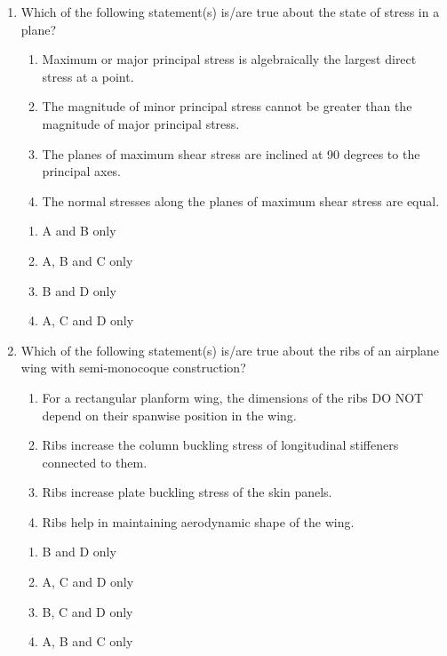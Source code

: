 \documentclass{article}
\begin{document}
\begin{enumerate}[leftmargin=*, resume]
\item Which of the following statement(s) is/are true about the state of stress in a plane?
\begin{enumerate}
\item Maximum or major principal stress is algebraically the largest direct stress at a point.
\item The magnitude of minor principal stress cannot be greater than the magnitude of major principal stress.
\item The planes of maximum shear stress are inclined at 90 degrees to the principal axes.
\item The normal stresses along the planes of maximum shear stress are equal.
\end{enumerate}
\begin{multicols}{4}
\begin{enumerate}
\item A and B only
\item A, B and C only
\item B and D only
\item A, C and D only
\end{enumerate}
\end{multicols}

\item Which of the following statement(s) is/are true about the ribs of an airplane wing with semi-monocoque construction?
\begin{enumerate}
\item For a rectangular planform wing, the dimensions of the ribs DO NOT depend on their spanwise position in the wing.
\item Ribs increase the column buckling stress of longitudinal stiffeners connected to them.
\item Ribs increase plate buckling stress of the skin panels.
\item Ribs help in maintaining aerodynamic shape of the wing.
\end{enumerate}
\begin{multicols}{4}
\begin{enumerate}
\item B and D only
\item A, C and D only
\item B, C and D only
\item A, B and C only
\end{enumerate}
\end{multicols}


\end{enumerate}
\end{document}
